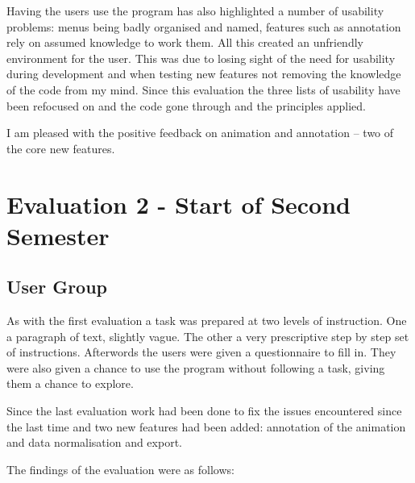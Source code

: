 Having the users use the program has also highlighted a number of usability problems: menus being badly organised and named, features such as annotation rely on assumed knowledge to work them.  All this created an unfriendly environment for the user.  This was due to losing sight of the need for usability during development and when testing new features not removing the knowledge of the code from my mind.  Since this evaluation the three lists of usability have been refocused on and the code gone through and the principles applied.

I am pleased with the positive feedback on animation and annotation -- two of the core new features.

\section{Evaluation 2 - Start of Second Semester}
\subsection{User Group}

As with the first evaluation a task was prepared at two levels of instruction.  One a paragraph of text, slightly vague.  The other a very prescriptive step by step set of instructions.  Afterwords the users were given a questionnaire to fill in.  They were also given a chance to use the program without following a task, giving them a chance to explore.

Since the last evaluation work had been done to fix the issues encountered since the last time and two new features had been added: annotation of the animation and data normalisation and export.

The findings of the evaluation were as follows:

